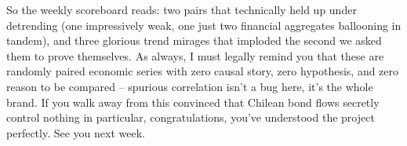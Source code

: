 So the weekly scoreboard reads: two pairs that technically held up under detrending (one impressively weak, one just two financial aggregates ballooning in tandem), and three glorious trend mirages that imploded the second we asked them to prove themselves. As always, I must legally remind you that these are randomly paired economic series with zero causal story, zero hypothesis, and zero reason to be compared -- spurious correlation isn't a bug here, it's the whole brand. If you walk away from this convinced that Chilean bond flows secretly control nothing in particular, congratulations, you've understood the project perfectly. See you next week.
